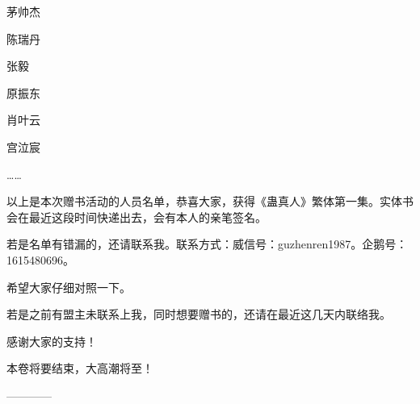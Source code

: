 \begin{this_body}
茅帅杰

陈瑞丹

张毅

原振东

肖叶云

宫泣宸

……

以上是本次赠书活动的人员名单，恭喜大家，获得《蛊真人》繁体第一集。实体书会在最近这段时间快递出去，会有本人的亲笔签名。

若是名单有错漏的，还请联系我。联系方式：威信号：guzhenren1987。企鹅号：1615480696。

希望大家仔细对照一下。

若是之前有盟主未联系上我，同时想要赠书的，还请在最近这几天内联络我。

感谢大家的支持！

本卷将要结束，大高潮将至！

------------

\end{this_body}

